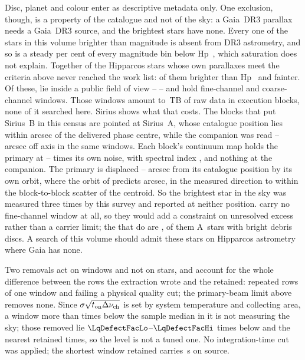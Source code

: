 Disc, planet and colour enter as descriptive metadata only. One exclusion,
though, is a property of the catalogue and not of the sky: a Gaia~DR3
parallax needs a Gaia~DR3 source, and the brightest stars have none. Every
one of the \BsNBright{} stars in this volume brighter than \BsBrightMag{}
magnitude is absent from DR3 astrometry, and so is a steady
\BsGapFaintPct{} per cent of every magnitude bin below Hp~\BsGapMagCut,
which saturation does not explain. Together \BsNGap{} of the \BsNVol{} Hipparcos stars whose own parallaxes
meet the criteria above never reached the work list: \BsGapNBright{} of them
brighter than Hp~\BsGapMagCut{} and \BsGapNFaint{} fainter. Of these,
\BsNAlmaWord{} lie inside a public field of view -- \BsStarList{} -- and
hold \BsNWinA{} fine-channel and \BsNWinB{} coarse-channel windows. Those
windows amount to \BsRawTB\,TB of raw data in \BsNEB{} execution blocks,
none of it searched here. Sirius shows what that costs. The \BsSirNEBWord{} blocks that put
Sirius~B in this census are pointed at Sirius~A, whose catalogue position lies
within \BsSirSepA{} arcsec of the delivered phase centre, while the companion
was read \BsSirOffLo--\BsSirOffHi{} arcsec off axis in the same
\BsSirNWin{} windows. Each block's continuum map holds the primary at
\BsSirSnrLo--\BsSirSnrHi{} times its own noise, with spectral index
\BsSirAlpha, and nothing at the companion. The primary is displaced
\BsSirCenLo--\BsSirCenHi{} arcsec from its catalogue position by its own
orbit, where the orbit of \citet{bond2017} predicts \OmSirPredArcsec{}
arcsec, in the measured direction to within the block-to-block scatter of the
centroid. So the brightest star in the sky was measured three times by this
survey and reported at neither position. \BsNoFineList{} carry no fine-channel
window at all, so they would add a constraint on unresolved excess rather
than a carrier limit; the \BsNFineWord{} that do are \BsFineList,
\BsNFineATypeWord{} of them A~stars with bright debris discs. A search of
this volume should admit these stars on Hipparcos astrometry where Gaia has
none.

Two removals act on windows and not on stars, and account for the whole
difference between the
\LqNExport{} rows the extraction wrote and the \NWindows{} retained:
\NDup{} repeated rows of one window and
\NDefect{} failing a physical quality cut; the
primary-beam limit above removes none.
Since $\sigma\sqrt{t_{\rm on}\Delta\nu_{\rm ch}}$ is set by system
temperature and collecting area, a window more than \LqDefectCut{} times
below the sample median in it is not measuring the sky; those removed lie
$\LqDefectFacLo$--$\LqDefectFacHi$ times below and the nearest retained
\LqKeptFac{} times, so the level is not a tuned one. No integration-time cut
was applied; the shortest window retained carries \LqOnsrcMin\,s on source.

